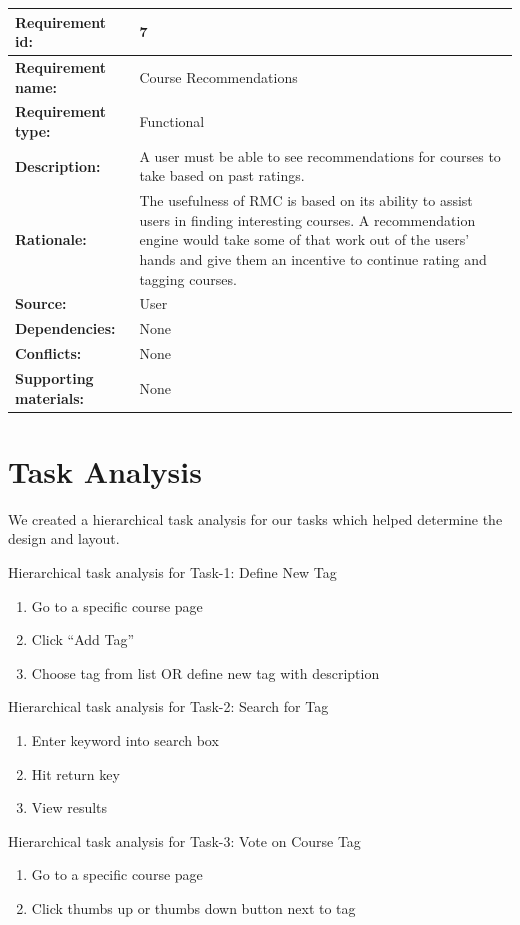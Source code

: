 \documentclass[12pt]{report}
\begin{document}
\begin{tabular}{|l|p{7.5cm}|}
\hline
\textbf{Requirement id:}	& 7 \\
\hline
\textbf{Requirement name:}	&  Course Recommendations \\
\hline
\textbf{Requirement type:}	& Functional \\
\hline
\textbf{Description:}	&  A user must be able to see recommendations for courses to take based on past ratings. \\
\hline
\textbf{Rationale:}	&  The usefulness of RMC is based on its ability to assist users in finding interesting courses. A recommendation engine would take some of that work out of the users' hands and give them an incentive to continue rating and tagging courses. \\
\hline
\textbf{Source:}	& User \\
\hline
\textbf{Dependencies:}	& None \\
\hline
\textbf{Conflicts:}	& None \\
\hline
\textbf{Supporting materials:}	& None \\
\hline
\end{tabular}

\section{Task Analysis}

We created a hierarchical task analysis for our tasks which helped determine the design and layout.

Hierarchical task analysis for Task-1:  Define New Tag
\begin{enumerate}
\item Go to a specific course page
\item Click ``Add Tag''
\item Choose tag from list OR define new tag with description 
\end{enumerate}

Hierarchical task analysis for Task-2: Search for Tag
\begin{enumerate}
\item Enter keyword into search box
\item Hit return key
\item View results 
\end{enumerate}

Hierarchical task analysis for Task-3: Vote on Course Tag
\begin{enumerate}
\item Go to a specific course page
\item Click thumbs up or thumbs down button next to tag 
\end{enumerate}
\end{document}
